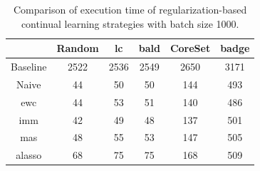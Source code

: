 
\begin{table}[h]
    \centering
    \begin{tabular}{c | c c c c c } 
         & Random & \gls{lc} & \gls{bald} & CoreSet & \gls{badge}\\ 
        \hline 
        Baseline & 2522 & 2536 & 2549 & 2650 & 3171 \\
        \hline
        Naive & 44 & 50 & 50 & 144 & 493 \\
        \gls{ewc} & 44 & 53 & 51 & 140 & 486\\
        \gls{imm} & 42 & 49 & 48 & 137 & 501\\
        \gls{mas} & 48 & 55 & 53 & 147 & 505\\
        \gls{alasso} & 68 & 75 & 75 & 168 & 509\\
    \end{tabular}
    \caption{Comparison of execution time of regularization-based continual learning strategies
    with batch size 1000.}
    \label{fig:Evaluation:Results:CAL:1000bTimeTable}
\end{table}


